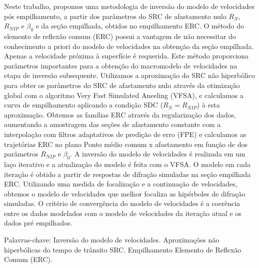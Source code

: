 \documentclass[
	12pt,				%
	openright,			%
	oneside,			%
	a4paper,			%
	english,			%
	brazil				%
	]{abntex2}
\begin{document}
\begin{resumo}
\OnehalfSpacing

Neste trabalho, propomos uma metodologia de inversão do modelo de velocidades pós empilhamento, a partir dos
parâmetros do SRC de afastamento nulo $R_N$, $R_{NIP}$ e $\beta_0$ e da seção empilhada, obtidos no empilhamento ERC.
O método do elemento de reflexão comum (ERC) possui a vantagem de 
não necessitar do conhecimento a priori do modelo de velocidades na obtenção da seção empilhada.
Apenas a velocidade próxima à superfície é requerida. 
Este método proporciona parâmetros importantes para a obtenção do
macromodelo de velocidades na etapa de inversão subsequente.
Utilizamos a aproximação do SRC não hiperbólico para
obter os parâmetros do SRC de afastamento nulo através da otimização global com o algoritmo Very Fast Simulated Aneeling (VFSA),
e calculamos a curva de empilhamento aplicando a condição SDC ($R_N=R_{NIP}$) à esta aproximação.
Obtemos as famílias ERC através da regularização dos dados, aumentando a amostragem das seções de afastamento constante
com a interpolação com filtros adaptativos de predição de erro (FPE) e calculamos as trajetórias ERC 
no plano Ponto médio comum x afastamento em função de dos parâmetros $R_{NIP}$ e $\beta_0$.
A inversão do modelo de velocidades é realizada em um laço iterativo e a atualização do modelo é feita com o VFSA.
O modelo em cada iteração é obtido a partir de respostas de difração simuladas na seção empilhada ERC. Utilizando uma
medida de focalização e a continuação de velocidades, obtemos o modelo de velocidades que melhor focaliza as hipérboles
de difração simuladas. O critério de convergência do modelo de velocidades é a coerência entre os dados modelados
com o modelo de velocidades da iteração atual e os dados pré empilhados.
\vspace{\onelineskip} 
 \noindent
 \par Palavras-chave: Inversão do modelo de velocidades. Aproximações não hiperbólicas do tempo de trânsito SRC. 
 Empilhamento Elemento de Reflexão Comum (ERC). 
\end{resumo}
\end{document}
